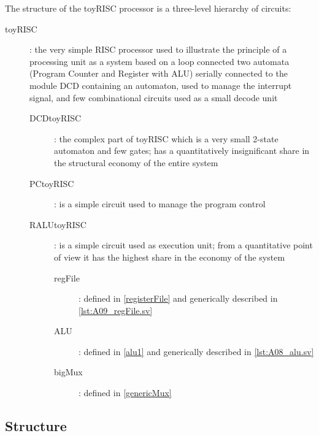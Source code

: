 The structure of the toyRISC processor is a three-level hierarchy of circuits:
\begin{description}
    \item[toyRISC]: the very simple RISC processor used to illustrate the principle of a processing unit as a system based on a loop connected two automata (Program Counter and Register with ALU) serially connected to the module DCD containing an automaton, used to manage the interrupt signal, and few combinational circuits used as a small decode unit
        \begin{description}
            \item[DCDtoyRISC]: the complex part of toyRISC which is a very small 2-state automaton and few gates; has a quantitatively insignificant share in the structural economy of the entire system
            \item[PCtoyRISC]: is a simple circuit used to manage the program control
            \item[RALUtoyRISC]: is a simple circuit used as execution unit; from a quantitative point of view it has the highest share in the economy of the system
                \begin{description}
                    \item[regFile]: defined in \ref{registerFile} and generically described  in \ref{lst:A09_regFile.sv}
                    \item[ALU]: defined in \ref{alu1} and generically described  in \ref{lst:A08_alu.sv}
                    \item[bigMux]: defined in \ref{genericMux}
                \end{description}     
        \end{description}
\end{description}

\subsection{Structure}

